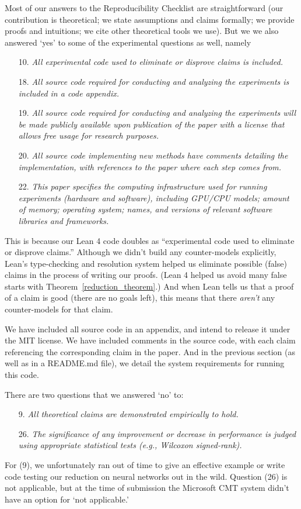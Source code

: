 \documentclass[letterpaper]{article}
\theoremstyle{definition}
\begin{document}
Most of our answers to the Reproducibility Checklist are straightforward (our contribution is theoretical; we state assumptions and claims formally; we provide proofs and intuitions; we cite other theoretical tools we use).  But we we also answered `yes' to some of the experimental questions as well, namely
\begin{itemize}
    \item[10.] \textit{All experimental code used to eliminate or disprove claims is included.} %
    \item[18.] \textit{All source code required for conducting and analyzing the experiments is included in a code appendix.} %
    \item[19.] \textit{All source code required for conducting and analyzing the experiments will be made publicly available upon publication of the paper with a license that allows free usage for research purposes.} %
    \item[20.] \textit{All source code implementing new methods have comments detailing the implementation, with references to the paper where each step comes from.} %
    \item[22.] \textit{This paper specifies the computing infrastructure used for running experiments (hardware and software), including GPU/CPU models; amount of memory; operating system; names, and versions of relevant software libraries and frameworks.} %
\end{itemize}
This is because our Lean 4 code doubles as ``experimental code used to eliminate or disprove claims.''  Although we didn't build any counter-models explicitly, Lean's type-checking and resolution system helped us eliminate possible (false) claims in the process of writing our proofs.  (Lean 4 helped us avoid many false starts with Theorem~\ref{reduction_theorem}.)  And when Lean tells us that a proof of a claim is good (there are no goals left), this means that there \emph{aren't} any counter-models for that claim.

We have included all source code in an appendix, and intend to release it under the MIT license.  We have included comments in the source code, with each claim referencing the corresponding claim in the paper.  And in the previous section (as well as in a README.md file), we detail the system requirements for running this code.

There are two questions that we answered `no' to:

\begin{itemize}
    \item[9.] \textit{All theoretical claims are demonstrated empirically to hold.} %
    \item[26.] \textit{The significance of any improvement or decrease in performance is judged using appropriate statistical tests (e.g., Wilcoxon signed-rank).} %
\end{itemize}

For (9), we unfortunately ran out of time to give an effective example or write code testing our reduction on neural networks out in the wild.  Question (26) is not applicable, but at the time of submission the Microsoft CMT system didn't have an option for `not applicable.'


\end{document}
